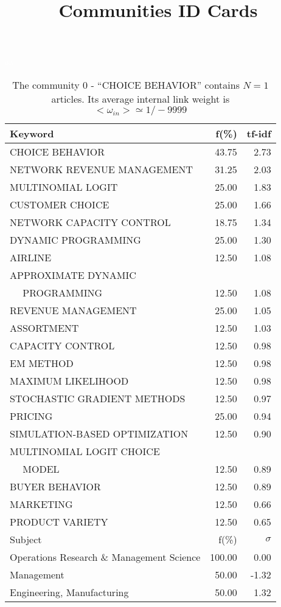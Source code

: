 \documentclass[a4paper,11pt]{report}
\title{{\bf Communities ID Cards}}
\date{\begin{flushleft}This document gather the ``ID Cards'' of the CC communities found within your database.\\
 The CC network was built by keeping a link between articles sharing at least 5 references. The communities characterized here correspond to the ones found in the level 0 (in the sense of the Louvain algo) which gathers more than 0 articles.\\
 These ID cards displays the most frequent keywords, subject categories, journals of publication, institution, countries, authors, references and reference journals of the articles of each community. The significance of an item $\sigma = \sqrt{N} (f - p) / \sqrt{p(1-p)}$ [where $N$ is the number of articles within the community and $f$ and $p$ are the proportion of articles respectively within the community and within the database displaying that item ] is also given (for example $\sigma > 5$ is really highly significant). The tf-idf value which can be calculated by $tf-idf = f*log(frac{1}{p})$ is also given.\\
\vspace{1cm}
\copyright Sebastian Grauwin, Liu Weizhi - (2014) \end{flushleft}}
\begin{document}
\begin{landscape}
\maketitle
\clearpage

\begin{table}[!ht]
\caption{The community 0 - ``CHOICE BEHAVIOR'' contains $N = 1$ articles. Its average internal link weight is $<\omega_{in}> \simeq 1/-9999$ }
\textcolor{white}{aa}\\
{\scriptsize\begin{tabular}{|l r  r|}
\hline
Keyword & f(\%) & tf-idf \\
\hline
CHOICE BEHAVIOR & 43.75 & 2.73\\
NETWORK REVENUE MANAGEMENT & 31.25 & 2.03\\
MULTINOMIAL LOGIT & 25.00 & 1.83\\
CUSTOMER CHOICE & 25.00 & 1.66\\
NETWORK CAPACITY CONTROL & 18.75 & 1.34\\
DYNAMIC PROGRAMMING & 25.00 & 1.30\\
AIRLINE & 12.50 & 1.08\\
APPROXIMATE DYNAMIC &  &\\
$\quad$ PROGRAMMING & 12.50 & 1.08\\
REVENUE MANAGEMENT & 25.00 & 1.05\\
ASSORTMENT & 12.50 & 1.03\\
CAPACITY CONTROL & 12.50 & 0.98\\
EM METHOD & 12.50 & 0.98\\
MAXIMUM LIKELIHOOD & 12.50 & 0.98\\
STOCHASTIC GRADIENT METHODS & 12.50 & 0.97\\
PRICING & 25.00 & 0.94\\
SIMULATION-BASED OPTIMIZATION & 12.50 & 0.90\\
MULTINOMIAL LOGIT CHOICE &  &\\
$\quad$ MODEL & 12.50 & 0.89\\
BUYER BEHAVIOR & 12.50 & 0.89\\
MARKETING & 12.50 & 0.66\\
PRODUCT VARIETY & 12.50 & 0.65\\
\hline
\hline
Subject & f(\%) & $\sigma$\\
\hline
Operations Research \& Management Science & 100.00 & 0.00\\
Management & 50.00 & -1.32\\
Engineering, Manufacturing & 50.00 & 1.32\\

\end{tabular}}
\end{table}
\end{landscape}
\end{document}
